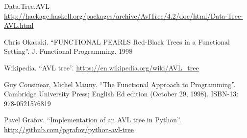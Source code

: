 \documentclass[b5paper]{ctexart}
\begin{document}
\ifx\wholebook\relax \else
\begin{thebibliography}{99}

Data.Tree.AVL \url{http://hackage.haskell.org/packages/archive/AvlTree/4.2/doc/html/Data-Tree-AVL.html}

Chris Okasaki. ``FUNCTIONAL PEARLS Red-Black Trees in a Functional Setting''. J. Functional Programming. 1998

Wikipedia. ``AVL tree''. \url{https://en.wikipedia.org/wiki/AVL_tree}

Guy Cousinear, Michel Mauny. ``The Functional Approach to Programming''. Cambridge University Press; English Ed edition (October 29, 1998). ISBN-13: 978-0521576819

Pavel Grafov. ``Implementation of an AVL tree in Python''. \url{http://github.com/pgrafov/python-avl-tree}
\end{thebibliography}
\end{document}
